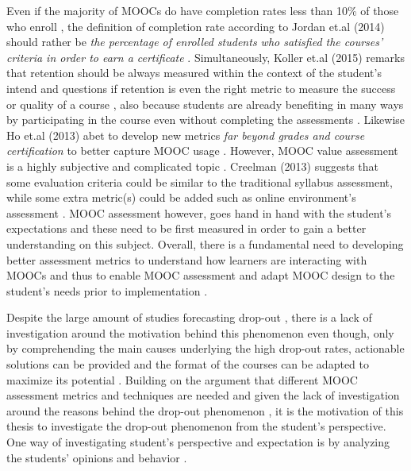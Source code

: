 \documentclass[
	a4paper,
	pdftex,
	12pt,	
	footinclude=true,
	fleqn,
	final,
	]{report}%
\begin{document}
Even if the majority of MOOCs do have completion rates less than 10\% of 
those who enroll \cite{Koller2013}, the definition of completion rate according 
to Jordan et.al (2014) should rather be \emph{the percentage of enrolled 
students who satisfied the courses' criteria in order to earn a certificate} \cite{Jordan2014}.
Simultaneously, Koller et.al (2015) remarks that retention should be always 
measured within the context of the student's intend and questions if retention is even the right metric 
to measure the success or quality of a course \cite{Koller2015}, also because students are 
already benefiting in many ways by participating in the course even without completing the 
assessments \cite{Koller2013}. Likewise Ho et.al (2013) abet to develop new metrics \emph{far beyond grades and course certification}
to better capture MOOC usage \cite{Ho2013}. However, MOOC value assessment is a highly subjective and 
complicated topic \cite{Russell2013}. Creelman (2013) suggests that some evaluation criteria could 
be similar to the traditional syllabus assessment, while some extra metric(s) could be added such 
as online environment's assessment \cite{Creelman2013}. 
MOOC assessment however, goes hand in hand with the student's expectations \cite{Hayes2015} 
and these need to be first measured in order to gain a better understanding on this subject.
Overall, there is a fundamental need to developing better assessment metrics to 
understand how learners are interacting with MOOCs \cite{Conole2013} and thus to 
enable MOOC assessment and adapt MOOC design to the student's needs prior to 
implementation \cite{Hayes2015}.

Despite the large amount of studies forecasting drop-out \cite{Balakrishnan2013,Open2014,Wen2014}, 
there is a lack of investigation around the motivation behind this phenomenon
even though, only by comprehending the main causes underlying the high drop-out rates, 
actionable solutions \cite{Adamopoulos2013} can be provided and the format of the courses can be 
adapted to maximize its potential \cite{Hayes2015}. Building on the argument that different MOOC
assessment metrics and techniques are needed \cite{Conole2013,Ho2013,Ho2013a,Hayes2015} 
and given the lack of investigation around the reasons behind the drop-out 
phenomenon \cite{Adamopoulos2013}, it is the motivation of this thesis to 
investigate the drop-out phenomenon from the student's perspective. One way of 
investigating student's perspective and expectation is by analyzing
the students' opinions and behavior \cite{Rose2014}. 
\end{document}
